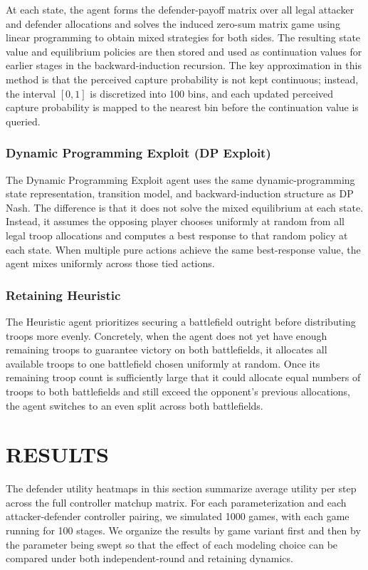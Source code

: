 \documentclass[letterpaper, 10 pt, conference]{ieeeconf}  %
\begin{document}
At each state, the agent forms the defender-payoff matrix over all legal attacker and defender allocations and solves the induced zero-sum matrix game using linear programming to obtain mixed strategies for both sides. The resulting state value and equilibrium policies are then stored and used as continuation values for earlier stages in the backward-induction recursion. The key approximation in this method is that the perceived capture probability is not kept continuous; instead, the interval $[0,1]$ is discretized into 100 bins, and each updated perceived capture probability is mapped to the nearest bin before the continuation value is queried.
\subsubsection{Dynamic Programming Exploit (DP Exploit)}
The Dynamic Programming Exploit agent uses the same dynamic-programming state representation, transition model, and backward-induction structure as DP Nash. The difference is that it does not solve the mixed equilibrium at each state. Instead, it assumes the opposing player chooses uniformly at random from all legal troop allocations and computes a best response to that random policy at each state. When multiple pure actions achieve the same best-response value, the agent mixes uniformly across those tied actions.
\subsubsection{Retaining Heuristic}
The Heuristic agent prioritizes securing a battlefield outright before distributing troops more evenly. Concretely, when the agent does not yet have enough remaining troops to guarantee victory on both battlefields, it allocates all available troops to one battlefield chosen uniformly at random. Once its remaining troop count is sufficiently large that it could allocate equal numbers of troops to both battlefields and still exceed the opponent's previous allocations, the agent switches to an even split across both battlefields.

\section{RESULTS}
The defender utility heatmaps in this section summarize average utility per step across the full controller matchup matrix. For each parameterization and each attacker-defender controller pairing, we simulated 1000 games, with each game running for 100 stages. We organize the results by game variant first and then by the parameter being swept so that the effect of each modeling choice can be compared under both independent-round and retaining dynamics.
\end{document}
